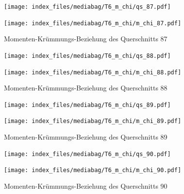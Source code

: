 \documentclass[
  11pt,
  letterpaper,
]{scrreprt}
\begin{document}
\begin{figure}[H]

\begin{minipage}{0.50\linewidth}
\texttt{[image: index\_files/mediabag/T6\_m\_chi/qs\_87.pdf]}\end{minipage}%
%
\begin{minipage}{0.50\linewidth}
\texttt{[image: index\_files/mediabag/T6\_m\_chi/m\_chi\_87.pdf]}\end{minipage}%

\caption{\label{fig-mchi_anhang}Momenten-Krümmungs-Beziehung des
Querschnitts 87}

\end{figure}%

\begin{figure}[H]

\begin{minipage}{0.50\linewidth}
\texttt{[image: index\_files/mediabag/T6\_m\_chi/qs\_88.pdf]}\end{minipage}%
%
\begin{minipage}{0.50\linewidth}
\texttt{[image: index\_files/mediabag/T6\_m\_chi/m\_chi\_88.pdf]}\end{minipage}%

\caption{\label{fig-mchi_anhang}Momenten-Krümmungs-Beziehung des
Querschnitts 88}

\end{figure}%

\begin{figure}[H]

\begin{minipage}{0.50\linewidth}
\texttt{[image: index\_files/mediabag/T6\_m\_chi/qs\_89.pdf]}\end{minipage}%
%
\begin{minipage}{0.50\linewidth}
\texttt{[image: index\_files/mediabag/T6\_m\_chi/m\_chi\_89.pdf]}\end{minipage}%

\caption{\label{fig-mchi_anhang}Momenten-Krümmungs-Beziehung des
Querschnitts 89}

\end{figure}%

\begin{figure}[H]

\begin{minipage}{0.50\linewidth}
\texttt{[image: index\_files/mediabag/T6\_m\_chi/qs\_90.pdf]}\end{minipage}%
%
\begin{minipage}{0.50\linewidth}
\texttt{[image: index\_files/mediabag/T6\_m\_chi/m\_chi\_90.pdf]}\end{minipage}%

\caption{\label{fig-mchi_anhang}Momenten-Krümmungs-Beziehung des
Querschnitts 90}

\end{figure}%
\end{document}
